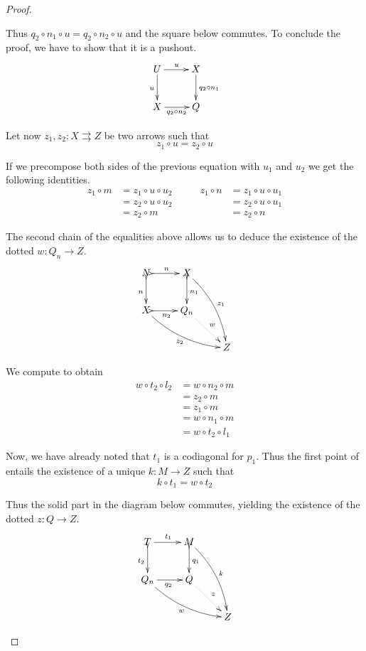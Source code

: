\begin{proof}
\begin{enumerate}
		Thus $q_2\circ n_1\circ u = q_2\circ n_2\circ u$ and the square below commutes. To conclude the proof, we have to show that it is a pushout.
		\[\xymatrix{U \ar[r]^u \ar[d]_u & X \ar[d]^{q_2\circ n_1}\\  X\ar[r]_{q_2\circ n_2} &  Q }\]
		
		Let now $z_1, z_2\colon X\rightrightarrows Z$ be two arrows such that 
		\[z_1\circ u=z_2\circ u\]
		
		If we precompose both sides of the previous equation  with $u_1$ and $u_2$ we get the following identities.
		\[\begin{split}
			z_1\circ m &= z_1\circ u\circ u_2\\&=z_2\circ u \circ u_2\\&=z_2\circ m
		\end{split} \qquad \begin{split}
			z_1\circ n &= z_1\circ u\circ u_1\\&=z_2\circ u \circ u_1\\&=z_2\circ n
		\end{split}\]
			
		The second chain of the equalities above allows us to deduce the existence of the dotted $w\colon Q_n\to Z$.
		\[\xymatrix{N \ar@{>->}[r]^{n} \ar@{>->}[d]_{n} & X\ar@{>->}[d]^{n_1} \ar@/^.3cm/[ddr]^{z_1} \\ X \ar@/_.3cm/[drr]_{z_2}\ar@{>->}[r]_{n_2} & Q_n \ar@{.>}[dr]^{w} \\ && Z}\]
		
		We compute to obtain
		\begin{align*}w\circ t_2\circ l_2&=w\circ n_2\circ m\\&=z_2\circ m\\&=z_1\circ m\\&=w\circ n_1\circ m\\&=w\circ t_2\circ l_1
		\end{align*}
		
	Now, we have already noted that $t_1$ is a codiagonal for $p_1$. Thus the first point of   entails the existence of a unique $k\colon M\to Z$ such that 
	\[k\circ t_1=w\circ t_2\]
	
	Thus the solid part in the diagram below commutes, yielding the existence of the dotted $z\colon Q\to Z$.
		\[\xymatrix{T \ar[r]^{t_1} \ar@{>->}[d]_{t_2}& M \ar@/^.3cm/[ddr]^{k}\ar@{>->}[d]^{q_1}\\ Q_n \ar@/_.3cm/[drr]_{w}\ar[r]_{q_2} & Q \ar@{.>}[dr]^{z}\\ && Z }\]


\end{enumerate}
\end{proof}
